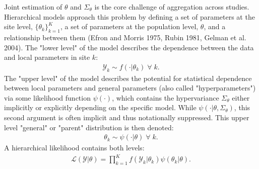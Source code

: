 \documentclass[AER]{AEA}
\begin{document}
Joint estimation of $\theta$ and $\Sigma_{\theta}$ is the core challenge of aggregation across studies. Hierarchical models approach this problem by defining a set of parameters at the site level, $\{ \theta_k\}_{k=1}^K$, a set of parameters at the population level, $\theta$, and a relationship between them (Efron and Morris 1975, Rubin 1981, Gelman et al. 2004). The "lower level" of the model describes the dependence between the data and local parameters in site $k$:
\begin{equation}
\begin{aligned}
\mathcal{Y}_k \sim f(\cdot | \theta_k) \; \forall \; k.
\end{aligned}
\label{lower level likelihood}
\end{equation}
The "upper level" of the model describes the potential for statistical dependence between local parameters and general parameters (also called "hyperparameters") via some likelihood function $\psi(\cdot)$, which contains the hypervariance $\Sigma_{\theta}$ either implicitly or explicitly depending on the specific model. While $\psi(\cdot | \theta, \Sigma_{\theta})$, this second argument is often implicit and thus notationally suppressed. This upper level "general" or "parent" distribution is then denoted:
\begin{equation}
\begin{aligned}
\theta_k \sim \psi(\cdot | \theta) \; \forall \; k.
\end{aligned}
\label{upper level likelihood}
\end{equation}
A hierarchical likelihood contains both levels: \begin{equation}
\begin{aligned}
\mathcal{L}(\mathcal{Y} | \theta) = \prod_{k=1}^K f(\mathcal{Y}_k | \theta_k)\psi(\theta_k | \theta).
\end{aligned}
\label{hierarchical likelihood}
\end{equation}
\end{document}
